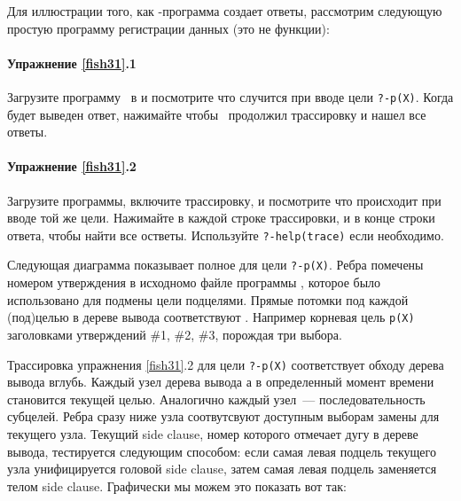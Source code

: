 \label{fish31}

Для иллюстрации того, как \prolog-программа создает ответы, рассмотрим следующую
простую программу регистрации данных (это не функции):


\paragraph{Упражнение \ref{fish31}.1} Загрузите программу \ в \prolog и
посмотрите что случится при вводе цели \verb|?-p(X)|. Когда будет выведен ответ,
нажимайте \keys{;} чтобы \prolog\ продолжил трассировку и нашел все ответы.

\paragraph{Упражнение \ref{fish31}.2} Загрузите программы, включите
трассировку, и посмотрите что происходит при вводе той же цели.
Нажимайте  в каждой строке трассировки, и \keys{;} в
конце строки ответа, чтобы найти все остветы. Используйте \verb|?-help(trace)|
если необходимо.


Следующая диаграмма показывает полное  для
цели \verb|?-p(X)|. Ребра помечены номером утверждения в исходномо файле
программы , которое было использовано для подмены цели подцелями.
Прямые потомки под каждой (под)целью в дереве вывода соответствуют
. Например корневая цель \verb|p(X)|
 заголовками утверждений \#1, \#2, \#3,
порождая три выбора.


Трассировка упражнения \ref{fish31}.2 для цели \verb|?-p(X)| соответствует
обходу дерева вывода вглубь. Каждый узел дерева вывода \prolog а в определенный
момент времени становится текущей целью. Аналогично каждый узел\ ---
последовательность субцелей. Ребра сразу ниже узла соотвутсвуют доступным
выборам замены для текущего узла. Текущий side clause, номер которого отмечает
дугу в дереве вывода, тестируется следующим способом: если самая левая подцель
текущего узла
унифицируется головой side clause, затем
самая левая подцель заменяется телом side clause.
Графически мы можем это показать вот так:


